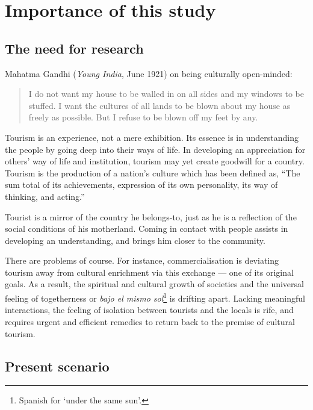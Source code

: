 \chapter{Importance of this study} %
\label{cha:ios}

\section{The need for research} %
\label{sec:nfr}

Mahatma Gandhi (\emph{Young India}, June 1921) on being culturally open-minded:

\begin{quote}
  I do not want my house to be walled in on all sides and my windows to be stuffed. I want the cultures of all lands to be blown about my house as freely as possible. But I refuse to be blown off my feet by any.
\end{quote}

\noindent Tourism is an experience, not a mere exhibition. Its essence is in understanding the people by going deep into their ways of life. In developing an appreciation for others' way of life and institution, tourism may yet create goodwill for a country. Tourism is the production of a nation's culture which has been defined as, ``The sum total of its achievements, expression of its own personality, its way of thinking, and acting.''

Tourist is a mirror of the country he belongs-to, just as he is a reflection of the social conditions of his motherland. Coming in contact with people assists in developing an understanding, and brings him closer to the community.

There are problems of course. For instance, commercialisation is deviating tourism away from cultural enrichment via this exchange --- one of its original goals. As a result, the spiritual and cultural growth of societies and the universal feeling of togetherness or \emph{bajo el mismo sol}\footnote{Spanish for `under the same sun'.} is drifting apart. Lacking meaningful interactions, the feeling of isolation between tourists and the locals is rife, and requires urgent and efficient remedies to return back to the premise of cultural tourism.


 \section{Present scenario} %
\label{sec:psc}

